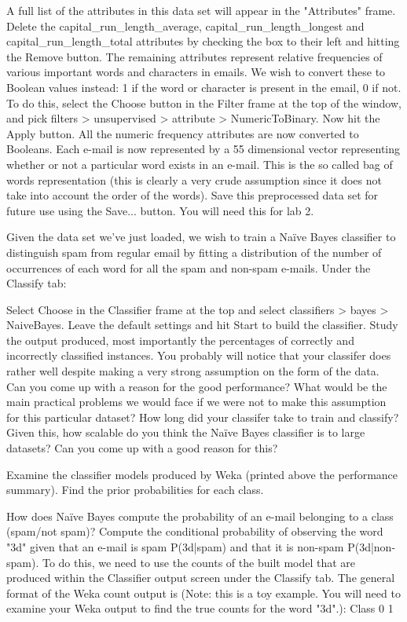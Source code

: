 \documentclass{article}
\begin{document}
A full list of the attributes in this data set will appear in the "Attributes" frame.
Delete the capital_run_length_average, capital_run_length_longest and capital_run_length_total attributes by checking the box to their left and hitting the Remove button.
The remaining attributes represent relative frequencies of various important words and characters in emails. We wish to convert these to Boolean values instead: 1 if the word or character is present in the email, 0 if not. To do this, select the Choose button in the Filter frame at the top of the window, and pick filters > unsupervised > attribute > NumericToBinary. Now hit the Apply button. All the numeric frequency attributes are now converted to Booleans. Each e-mail is now represented by a 55 dimensional vector representing whether or not a particular word exists in an e-mail. This is the so called bag of words representation (this is clearly a very crude assumption since it does not take into account the order of the words).
Save this preprocessed data set for future use using the Save... button. You will need this for lab 2.

Given the data set we've just loaded, we wish to train a Naïve Bayes classifier to distinguish spam from regular email by fitting a distribution of the number of occurrences of each word for all the spam and non-spam e-mails. Under the Classify tab:

Select Choose in the Classifier frame at the top and select classifiers > bayes > NaiveBayes.
Leave the default settings and hit Start to build the classifier. Study the output produced, most importantly the percentages of correctly and incorrectly classified instances. You probably will notice that your classifer does rather well despite making a very strong assumption on the form of the data.
Can you come up with a reason for the good performance? What would be the main practical problems we would face if we were not to make this assumption for this particular dataset?
How long did your classifer take to train and classify? Given this, how scalable do you think the Naïve Bayes classifier is to large datasets? Can you come up with a good reason for this?

Examine the classifier models produced by Weka (printed above the performance summary). Find the prior probabilities for each class.

How does Naïve Bayes compute the probability of an e-mail belonging to a class (spam/not spam)?
Compute the conditional probability of observing the word "3d" given that an e-mail is spam P(3d|spam) and that it is non-spam P(3d|non-spam). To do this, we need to use the counts of the built model that are produced within the Classifier output screen under the Classify tab. The general format of the Weka count output is (Note: this is a toy example. You will need to examine your Weka output to find the true counts for the word "3d".):
 	Class
 	0	1
\end{document}
